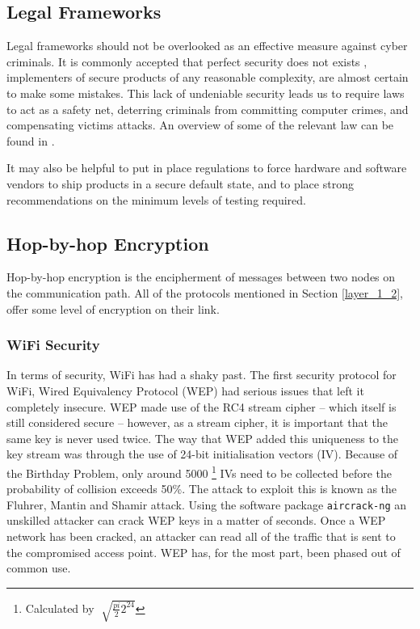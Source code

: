 \documentclass[10pt,journal,compsoc]{IEEEtran}
\begin{document}
\subsection{Legal Frameworks}
Legal frameworks should not be overlooked as an effective measure against cyber
criminals. It is commonly accepted that perfect security does not exists
\cite{ThereMustBeA}, implementers of secure products of any reasonable
complexity, are almost certain to make some mistakes. This lack of undeniable
security leads us to require laws to act as a safety net, deterring criminals
from committing computer crimes, and compensating victims attacks. An overview
of some of the relevant law can be found in \cite{Weber2010}. 

It may also be helpful to put in place regulations to force hardware and
software vendors to ship products in a secure default state, and to place
strong recommendations on the minimum levels of testing required. 

\subsection{Hop-by-hop Encryption}
Hop-by-hop encryption is the encipherment of messages between two nodes on the
communication path. All of the  protocols mentioned in Section \ref{layer_1_2}, offer
some level of encryption on their link. 

\subsubsection{WiFi Security}
In terms of security, WiFi has had a shaky past. The first security protocol
for WiFi, Wired Equivalency Protocol (WEP) had serious issues that left it
completely insecure. WEP made use of the RC4 stream cipher -- which itself
is still considered secure -- however, as a stream cipher, it is important
that the same key is never used twice. The way that WEP added this
uniqueness to the key stream was through the use of 24-bit initialisation
vectors (IV). Because of the Birthday Problem, only around 5000
\footnote{Calculated by $\sqrt[]{\frac{pi}{2} 2^{24}} $} IVs need to be
collected before the probability of collision exceeds 50\%.  The attack to
exploit this is known as the Fluhrer, Mantin and Shamir attack. Using the
software package {\tt aircrack-ng} an unskilled attacker can crack WEP keys
in a matter of seconds. Once a WEP network has been cracked, an attacker
can read all of the traffic that is sent to the compromised access point.
WEP has, for the most part, been phased out of common use.
\end{document}
